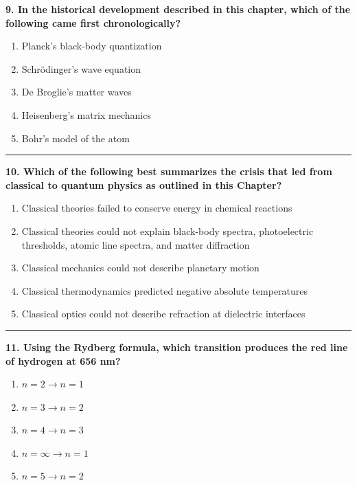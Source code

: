\documentclass[
  english,
  9pt,
]{extbook}
\providecommand{\tightlist}{%
  \setlength{\itemsep}{0pt}\setlength{\parskip}{0pt}}
\theoremstyle{definition}
\theoremstyle{definition}
\theoremstyle{definition}
\theoremstyle{definition}
\theoremstyle{remark}
\begin{document}
\textbf{9. In the historical development described in this chapter, which of the following came first chronologically?}

\begin{enumerate}
\def\labelenumi{\alph{enumi}.}
\tightlist
\item
  Planck's black-body quantization\\
\item
  Schrödinger's wave equation\\
\item
  De Broglie's matter waves\\
\item
  Heisenberg's matrix mechanics\\
\item
  Bohr's model of the atom
\end{enumerate}

\begin{center}\rule{0.5\linewidth}{0.5pt}\end{center}

\textbf{10. Which of the following best summarizes the crisis that led from classical to quantum physics as outlined in this Chapter?}

\begin{enumerate}
\def\labelenumi{\alph{enumi}.}
\tightlist
\item
  Classical theories failed to conserve energy in chemical reactions
\item
  Classical theories could not explain black-body spectra, photoelectric thresholds, atomic line spectra, and matter diffraction
\item
  Classical mechanics could not describe planetary motion
\item
  Classical thermodynamics predicted negative absolute temperatures
\item
  Classical optics could not describe refraction at dielectric interfaces
\end{enumerate}

\begin{center}\rule{0.5\linewidth}{0.5pt}\end{center}

\textbf{11. Using the Rydberg formula, which transition produces the red line of hydrogen at 656 nm?}

\begin{enumerate}
\def\labelenumi{\alph{enumi}.}
\tightlist
\item
  \(n=2 \rightarrow n=1\)\\
\item
  \(n=3 \rightarrow n=2\)\\
\item
  \(n=4 \rightarrow n=3\)\\
\item
  \(n=\infty \rightarrow n=1\)\\
\item
  \(n=5 \rightarrow n=2\)
\end{enumerate}
\end{document}
